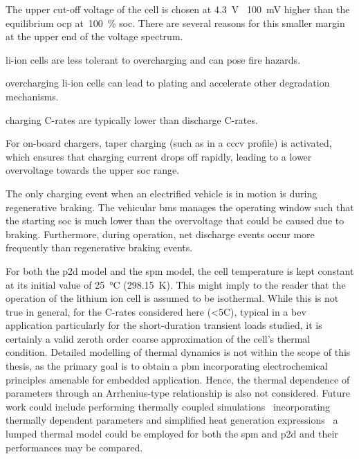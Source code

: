 The  upper   cut-off  voltage   of  the  cell   is  chosen   at  \SI{4.3}{\volt}
\ie~\approx\SI{100}{\milli\volt} higher  than  the  equilibrium \gls{ocp}  at~\SI{100}{\percent} \gls{soc}. There are several  reasons for this smaller margin
at the upper end of the voltage spectrum.
\begin{description}[leftmargin=!,labelwidth=\widthof{\bfseries low
    probabilities},itemsep=1ex]

\item[safety] li-ion  cells are less  tolerant to overcharging and  can pose
    fire hazards.

\item[degradation]  overcharging  li-ion  cells  can  lead  to  plating  and
    accelerate other degradation mechanisms.

\item[low  C-rates]  charging C-rates  are  typically  lower than  discharge
    C-rates.

\item[CCCV charging]  For on-board  chargers, taper charging  (such as  in a
    \gls{cccv} profile) is activated, which  ensures that charging current drops
    off  rapidly, leading  to a  lower overvoltage  towards the  upper \gls{soc}
    range.

\item[low probabilities] The only charging event when an electrified vehicle
    is in motion is during regenerative braking. The vehicular \gls{bms} manages
    the operating window such that the starting \gls{soc} is much lower than the
    overvoltage  that  could  be  caused due  to  braking.  Furthermore,  during
    operation, net discharge events  occur more frequently than regenerative
    braking events.

\end{description}

For  both the  \gls{p2d} model  and the  \gls{spm} model,  the cell  temperature
is   kept   constant   at   its   initial   value   of   \SI{25}{\degreeCelsius}
(\SI{298.15}{\kelvin}). This might imply to the reader that the operation of the
lithium ion cell is assumed to be isothermal. While this is not true in general,
for  the C-rates  considered  here  (<5C), typical  in  a \gls{bev}  application
particularly for the  short-duration transient loads studied, it  is certainly a
valid  zeroth  order  coarse  approximation of  the  cell's  thermal  condition.
Detailed modelling of  thermal dynamics is not within the  scope of this thesis,
as  the primary  goal is  to  obtain a  \gls{pbm} incorporating  electrochemical
principles amenable for  embedded application. Hence, the  thermal dependence of
parameters through an Arrhenius-type relationship is also not considered. Future
work could  include performing  thermally coupled  simulations \ie~incorporating
thermally dependent parameters and  simplified heat generation expressions \eg~a
lumped thermal model could be employed  for both the \gls{spm} and \gls{p2d} and
their performances may be compared.

